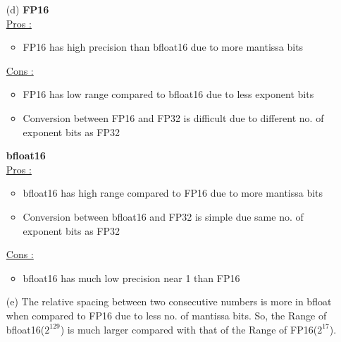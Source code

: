 \documentclass[letterpaper]{article}
\begin{document}
\begin{large}
\begin{flushleft}
\begin{enumerate}
\begin{enumerate}
\item[(d) ]\textbf{FP16}\\[0.1in]
\underline{Pros : }\\[0.1in]
\begin{itemize}
\item FP16 has high precision than bfloat16 due to more mantissa bits
\end{itemize}
\underline{Cons : }\\[0.1in]
\begin{itemize}
\item FP16 has low range compared to bfloat16 due to less exponent bits
\item Conversion between FP16 and FP32 is difficult due to different no. of exponent bits as FP32
\end{itemize}
\textbf{bfloat16}\\[0.1in]
\underline{Pros : }\\[0.1in]
\begin{itemize}
\item bfloat16 has high range compared to FP16 due to more mantissa bits
\item Conversion between bfloat16 and FP32 is simple due same no. of exponent bits as FP32
\end{itemize}
\underline{Cons : }\\[0.1in]
\begin{itemize}
\item bfloat16 has much low precision near 1 than FP16\\[0.2in]
\end{itemize}

\item[(e) ]The relative spacing between two consecutive numbers is more in bfloat when compared to FP16 due to less no. of mantissa bits. So, the Range of bfloat16($2^{129}$) is much larger compared with that of the Range of FP16($2^{17}$).\\[0.2in]
\end{enumerate}


\end{enumerate}
\end{flushleft}
\end{large}
\end{document}
